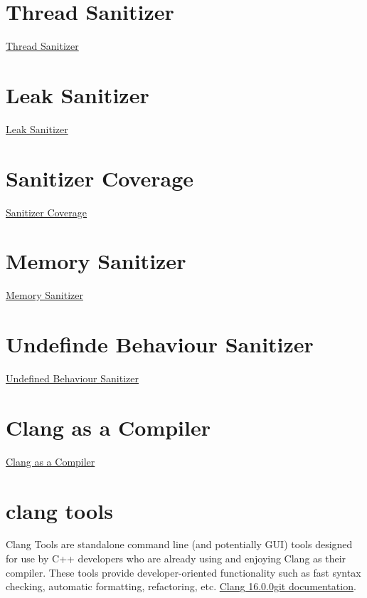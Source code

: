 \section{Thread Sanitizer}%
\label{sec:thread_sanitizer}
\href{https://clang.llvm.org/docs/ThreadSanitizer.html}{Thread Sanitizer}

\section{Leak Sanitizer}%
\label{sec:leak_sanitizer}
\href{https://clang.llvm.org/docs/LeakSanitizer.html}{Leak Sanitizer}


\section{Sanitizer Coverage}%
\label{sec:sanitizer_coverage}
\href{https://clang.llvm.org/docs/SanitizerCoverage.html}{Sanitizer Coverage}

\section{Memory Sanitizer}%
\label{sec:memory_sanitizer}
\href{https://clang.llvm.org/docs/MemorySanitizer.html}{Memory Sanitizer}

\section{Undefinde Behaviour Sanitizer}%
\label{sec:undefinde_behaviour_sanitizer}
\href{https://clang.llvm.org/docs/UndefinedBehaviorSanitizer.html}{Undefined Behaviour Sanitizer}















\section{Clang as a Compiler}%
\label{sec:clang_as_a_compiler}
\href{https://clang.llvm.org/docs/index.html} {Clang as a Compiler}


\section{clang tools}
Clang Tools are standalone command line (and potentially GUI) tools designed for use by C++ developers who are already using and enjoying Clang as their compiler. These tools provide developer-oriented functionality such as fast syntax checking, automatic formatting, refactoring, etc. \href{https://clang.llvm.org/docs/ClangTools.html}{Clang 16.0.0git documentation}.

